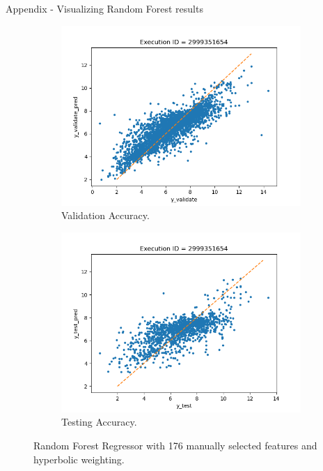 \documentclass{beamer}
\begin{document}
\begin{frame}[t]{Appendix - Visualizing Random Forest results}
\begin{figure}
     \centering
     \begin{subfigure}[b]{0.45\textwidth}
         \centering
         \includegraphics[scale=0.35]{images/accuracyRFRvalidate}
         \caption{Validation Accuracy.}
        \label{fig:accuracyRFRvalidate}
     \end{subfigure}
     \hfill
     \begin{subfigure}[b]{0.45\textwidth}
         \centering
         \includegraphics[scale=0.35]{images/accuracyRFRtest}
        \caption{Testing Accuracy.}
        \label{fig:accuracyRFRtest}
     \end{subfigure}
     \caption{Random Forest Regressor with 176 manually selected features and hyperbolic weighting.}
     \label{fig:RFMModel}
\end{figure}
\end{frame}
\end{document}
